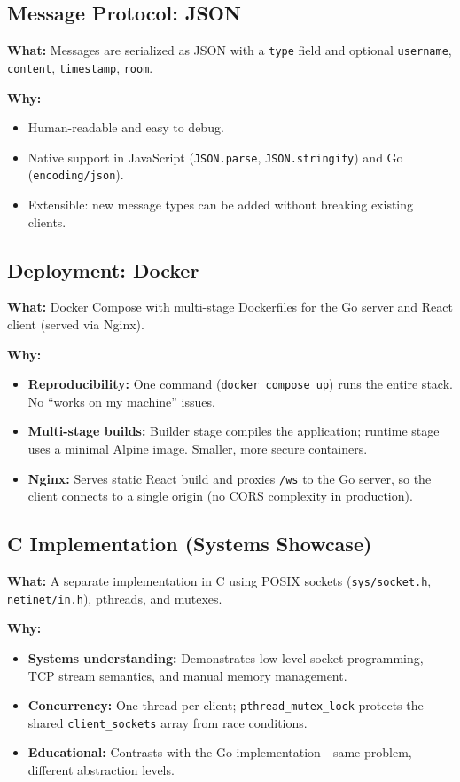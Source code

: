 \documentclass[11pt,a4paper]{article}
\begin{document}
\subsection{Message Protocol: JSON}

\textbf{What:} Messages are serialized as JSON with a \texttt{type} field and optional \texttt{username}, \texttt{content}, \texttt{timestamp}, \texttt{room}.

\textbf{Why:}
\begin{itemize}
    \item Human-readable and easy to debug.
    \item Native support in JavaScript (\texttt{JSON.parse}, \texttt{JSON.stringify}) and Go (\texttt{encoding/json}).
    \item Extensible: new message types can be added without breaking existing clients.
\end{itemize}

\subsection{Deployment: Docker}

\textbf{What:} Docker Compose with multi-stage Dockerfiles for the Go server and React client (served via Nginx).

\textbf{Why:}
\begin{itemize}
    \item \textbf{Reproducibility:} One command (\texttt{docker compose up}) runs the entire stack. No ``works on my machine'' issues.
    \item \textbf{Multi-stage builds:} Builder stage compiles the application; runtime stage uses a minimal Alpine image. Smaller, more secure containers.
    \item \textbf{Nginx:} Serves static React build and proxies \texttt{/ws} to the Go server, so the client connects to a single origin (no CORS complexity in production).
\end{itemize}

\subsection{C Implementation (Systems Showcase)}

\textbf{What:} A separate implementation in C using POSIX sockets (\texttt{sys/socket.h}, \texttt{netinet/in.h}), pthreads, and mutexes.

\textbf{Why:}
\begin{itemize}
    \item \textbf{Systems understanding:} Demonstrates low-level socket programming, TCP stream semantics, and manual memory management.
    \item \textbf{Concurrency:} One thread per client; \texttt{pthread\_mutex\_lock} protects the shared \texttt{client\_sockets} array from race conditions.
    \item \textbf{Educational:} Contrasts with the Go implementation—same problem, different abstraction levels.
\end{itemize}
\end{document}
